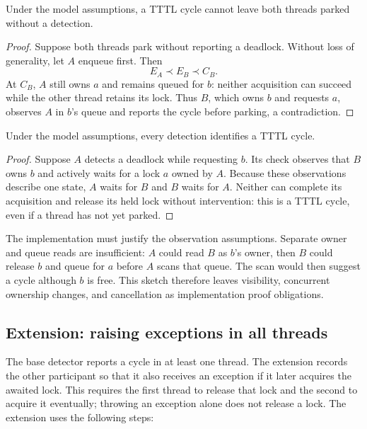 \begin{lemma}
Under the model assumptions, a TTTL cycle cannot leave both threads parked without a detection.
\end{lemma}
\begin{proof}
Suppose both threads park without reporting a deadlock.
Without loss of generality, let $A$ enqueue first. Then
\begin{equation}
E_A \prec E_B \prec C_B.
\end{equation}
At $C_B$, $A$ still owns $a$ and remains queued for $b$: neither acquisition can succeed while the other thread retains its lock.
Thus $B$, which owns $b$ and requests $a$, observes $A$ in $b$'s queue and reports the cycle before parking, a contradiction.
\end{proof}

\begin{lemma}
Under the model assumptions, every detection identifies a TTTL cycle.
\end{lemma}
\begin{proof}
Suppose $A$ detects a deadlock while requesting $b$.
Its check observes that $B$ owns $b$ and actively waits for a lock $a$ owned by $A$.
Because these observations describe one state, $A$ waits for $B$ and $B$ waits for $A$.
Neither can complete its acquisition and release its held lock without intervention: this is a TTTL cycle, even if a thread has not yet parked.
\end{proof}

The implementation must justify the observation assumptions.
Separate owner and queue reads are insufficient: $A$ could read $B$ as $b$'s owner, then $B$ could release $b$ and queue for $a$ before $A$ scans that queue.
The scan would then suggest a cycle although $b$ is free.
This sketch therefore leaves visibility, concurrent ownership changes, and cancellation as implementation proof obligations.

\subsection{Extension: raising exceptions in all threads}

The base detector reports a cycle in at least one thread. The extension records the other participant so that it also receives an exception if it later acquires the awaited lock.
This requires the first thread to release that lock and the second to acquire it eventually; throwing an exception alone does not release a lock.
The extension uses the following steps:


